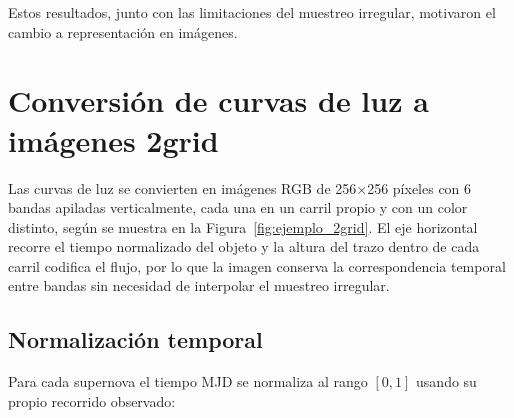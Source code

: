 \begin{figure}[H]
\centering
{}
\end{figure}

\begin{figure}[H]
\centering
{}
\end{figure}

Estos resultados, junto con las limitaciones del muestreo irregular, motivaron el cambio a representación en imágenes.

\section{Conversión de curvas de luz a imágenes 2grid}
\label{sec:render_2grid}

Las curvas de luz se convierten en imágenes RGB de 256×256 píxeles con 6 bandas apiladas verticalmente, cada una en un carril propio y con un color distinto, según se muestra en la Figura~\ref{fig:ejemplo_2grid}. El eje horizontal recorre el tiempo normalizado del objeto y la altura del trazo dentro de cada carril codifica el flujo, por lo que la imagen conserva la correspondencia temporal entre bandas sin necesidad de interpolar el muestreo irregular.

\begin{figure}[H]
\centering
{}
\end{figure}

\subsection{Normalización temporal}

Para cada supernova el tiempo MJD se normaliza al rango $[0, 1]$ usando su propio recorrido observado:

